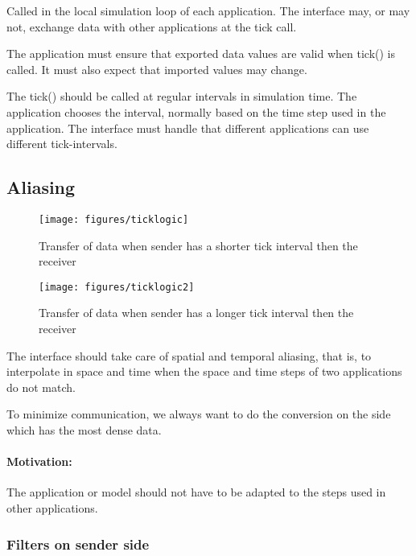 \documentclass[a4paper]{report}
\begin{document}
Called in the local simulation loop of each application.
The interface may, or may not, exchange data with other applications
at the tick call.

The application must ensure that exported data values are valid when
tick() is called.  It must also expect that imported values may change.

The tick() should be called at regular intervals in simulation time.
The application chooses the interval, normally based on the time step
used in the application.  The interface must handle that different
applications can use different tick-intervals.


\subsection{Aliasing}

\begin{figure}
  \begin{center}
    \begin{minipage}{0.45\textwidth}
      \texttt{[image: figures/ticklogic]}
      \caption{Transfer of data when sender has a shorter
        tick interval then the receiver}
    \end{minipage}
    \hfill
    \begin{minipage}{0.45\textwidth}
      \texttt{[image: figures/ticklogic2]}
      \caption{Transfer of data when sender has a longer
        tick interval then the receiver}
    \end{minipage}
  \end{center}
\end{figure}

The interface should take care of spatial and temporal aliasing, that
is, to interpolate in space and time when the space and time steps of
two applications do not match.

To minimize communication, we always want to do the conversion on the
side which has the most dense data.

\paragraph{Motivation:} The application or model should not have to be
adapted to the steps used in other applications.


\subsubsection{Filters on sender side}
\end{document}
